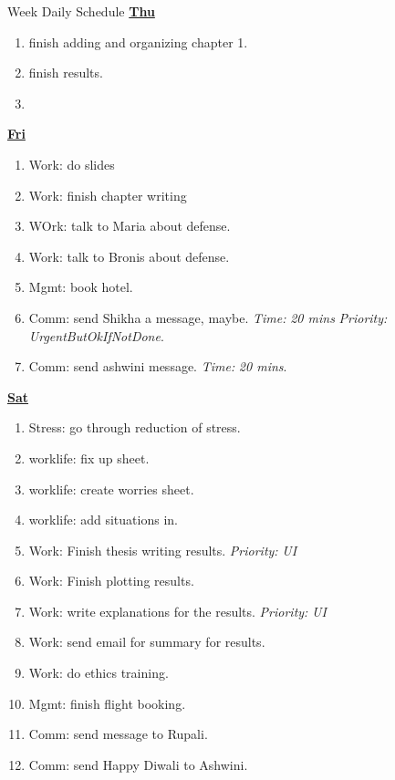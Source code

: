 \documentclass[serif, mathserif, final]{beamer}
\newcommand{\timeEst}[1]{\textit{Time:} \textit{#1}}
\newcommand{\priority}[1]{\textit{Priority:} \textit{#1}}
\begin{document}
\begin{frame}{}
\begin{columns}
\begin{column}{0.50\linewidth}
\begin{block}{Week Daily Schedule}
  \textbf{\small{\underline{Thu}}}
  \begin{enumerate} 
    \tiny \item \tiny finish adding and organizing chapter 1.  
  \item \tiny finish results.  
  \item \tiny 
  \end{enumerate}
  
  \textbf{\small {\underline{Fri}}} 
  \begin{enumerate} 
    \tiny \item \tiny Work: do slides
  \item \tiny Work: finish chapter writing 
  \item \tiny WOrk: talk to Maria about defense. 
  \item \tiny Work: talk to Bronis about defense. 
  \item \tiny Mgmt: book hotel. 
  \item \tiny Comm: send Shikha a message, maybe. \timeEst{20 mins} \priority{UrgentButOkIfNotDone}. 
  \item \tiny Comm: send ashwini message. \timeEst{20 mins}.  
  \end{enumerate} 
  
  \textbf{\small \underline{Sat}} 
  \begin{enumerate} 
    \tiny \item \tiny Stress: go through reduction of stress. 
  \item \tiny worklife: fix up sheet. 
  \item \tiny worklife: create worries sheet. 
  \item \tiny worklife: add situations in. 
\item \tiny Work: Finish thesis writing results. \priority{UI}
\item \tiny Work: Finish plotting results. 
\item \tiny Work: write explanations for the results. \priority{UI} 
\item \tiny Work: send email for summary for results. 
\item \tiny Work: do ethics training.  
\item \tiny Mgmt: finish flight booking. 
\item \tiny Comm: send message to Rupali. 
\item \tiny Comm: send Happy Diwali to Ashwini. 
\end{enumerate} 


\end{block}
\end{column}
\end{columns}
\end{frame}
\end{document}
